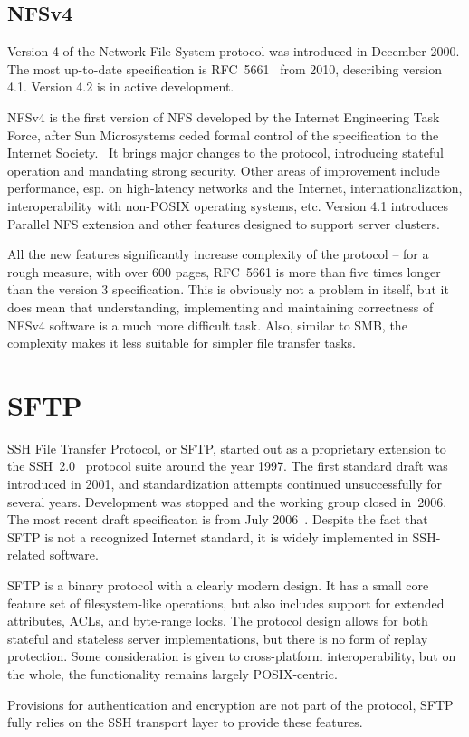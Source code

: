 \subsection{NFSv4}

Version 4 of the Network File System protocol was introduced in December 2000. The most up-to-date
specification is RFC~5661~\cite{rfc5661} from 2010, describing version 4.1. Version 4.2 is in active
development.

NFSv4 is the first version of NFS developed by the Internet Engineering Task Force, after Sun Microsystems
ceded formal control of the specification to the Internet Society.~\cite{rfc2339} It brings major changes to
the protocol, introducing stateful operation and mandating strong security. Other areas of improvement include
performance, esp. on high-latency networks and the Internet, internationalization, interoperability with
non-POSIX operating systems, etc. Version 4.1 introduces Parallel NFS extension and other features designed to
support server clusters.

All the new features significantly increase complexity of the protocol -- for a rough measure, with over 600
pages, RFC~5661 is more than five times longer than the version 3 specification. This is obviously not
a problem in itself, but it does mean that understanding, implementing and maintaining correctness of NFSv4
software is a much more difficult task. Also, similar to SMB, the complexity makes it less suitable for
simpler file transfer tasks.

\section{SFTP}

SSH File Transfer Protocol, or SFTP, started out as a proprietary extension to the SSH~2.0~\cite{rfc4251}
protocol suite around the year 1997. The first standard draft was introduced in 2001, and standardization
attempts continued unsuccessfully for several years. Development was stopped and the working group closed
in~2006.~\cite{secsh-email} The most recent draft specificaton is from July 2006~\cite{draft-secsh-13}.
Despite the fact that SFTP is not a recognized Internet standard, it is widely implemented in SSH-related
software.

SFTP is a binary protocol with a clearly modern design. It has a small core feature set of filesystem-like
operations, but also includes support for extended attributes, ACLs, and byte-range locks.  The protocol
design allows for both stateful and stateless server implementations, but there is no form of replay
protection. Some consideration is given to cross-platform interoperability, but on the whole, the
functionality remains largely POSIX-centric.

Provisions for authentication and encryption are not part of the protocol, SFTP fully relies on the SSH
transport layer to provide these features.
